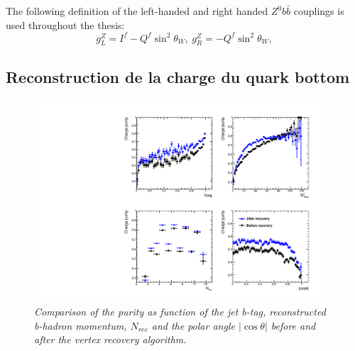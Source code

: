 The following definition of the left-handed and right handed $Z^0b\bar{b}$ couplings is used throughout the thesis: 
\begin{equation}
g_L^Z = I^f - Q^f\sin^2\theta_W, \  g_R^Z = -Q^f\sin^2\theta_W, 
\label{formula:EWcouplings_3F}
\end{equation}


\subsection*{Reconstruction de la charge du quark bottom}

\begin{figure}
	{\centering
		\includegraphics[width=0.95\textwidth]{ILD/plots/recovery-purity-comparison.pdf}
		\caption{\sl Comparison of the purity as function of the jet b-tag, reconstructed b-hadron momentum, $N_{rec}$ and the polar angle $|\cos\theta|$ before and after the vertex recovery algorithm.  
		}
		\label{fig:RecoveryPurityComparison_3F}
	}
\end{figure}

